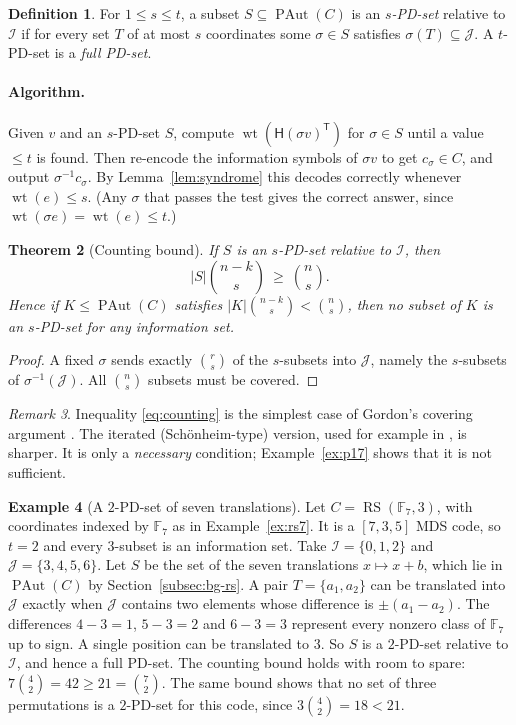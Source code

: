 \documentclass[12pt,letterpaper]{article}
\newtheorem{theorem}{Theorem}[section]
\theoremstyle{definition}
\newtheorem{definition}[theorem]{Definition}
\newtheorem{example}[theorem]{Example}
\theoremstyle{remark}
\newtheorem{remark}[theorem]{Remark}
\numberwithin{equation}{section}
\newcommand{\F}{\mathbb{F}}
\newcommand{\wt}{\operatorname{wt}}
\newcommand{\RS}{\operatorname{RS}}
\newcommand{\PAut}{\operatorname{PAut}}
\newcommand{\Hsys}{\mathsf{H}}
\newcommand{\cI}{\mathcal{I}}
\newcommand{\cJ}{\mathcal{J}}
\begin{document}
\begin{definition}\label{def:pd-set}
For $1\le s\le t$, a subset $S\subseteq\PAut(C)$ is an
\emph{$s$-PD-set} relative to $\cI$ if for every set $T$ of at most $s$
coordinates some $\sigma\in S$ satisfies $\sigma(T)\subseteq\cJ$.  A
$t$-PD-set is a \emph{full PD-set}.
\end{definition}

\paragraph{Algorithm.}
Given $v$ and an $s$-PD-set $S$, compute $\wt(\Hsys(\sigma v)^{\mathsf
T})$ for $\sigma\in S$ until a value $\le t$ is found.  Then re-encode the
information symbols of $\sigma v$ to get $c_\sigma\in C$, and output
$\sigma^{-1}c_\sigma$.  By Lemma~\ref{lem:syndrome} this decodes
correctly whenever $\wt(e)\le s$.  (Any $\sigma$ that passes the test
gives the correct answer, since $\wt(\sigma e)=\wt(e)\le t$.)

\begin{theorem}[Counting bound]\label{thm:counting}
If $S$ is an $s$-PD-set relative to $\cI$, then
\begin{equation}\label{eq:counting}
|S|\binom{n-k}{s}\ \ge\ \binom ns.
\end{equation}
Hence if $K\le\PAut(C)$ satisfies $|K|\binom{n-k}s<\binom ns$, then no
subset of $K$ is an $s$-PD-set for any information set.
\end{theorem}
\begin{proof}
A fixed $\sigma$ sends exactly $\binom rs$ of the $s$-subsets into $\cJ$,
namely the $s$-subsets of $\sigma^{-1}(\cJ)$.  All $\binom ns$ subsets
must be covered.
\end{proof}

\begin{remark}
Inequality \eqref{eq:counting} is the simplest case of Gordon's covering
argument \cite{Gor82}.  The iterated (Sch\"onheim-type) version, used for
example in \cite{KMM05}, is sharper.  It is only a \emph{necessary}
condition; Example~\ref{ex:p17} shows that it is not sufficient.
\end{remark}

\begin{example}[A $2$-PD-set of seven translations]\label{ex:pd-translations}
Let $C=\RS(\F_7,3)$, with coordinates indexed by $\F_7$ as in
Example~\ref{ex:rs7}. It is a $[7,3,5]$ MDS code, so $t=2$ and every
$3$-subset is an information set. Take $\cI=\{0,1,2\}$ and
$\cJ=\{3,4,5,6\}$. Let $S$ be the set of the seven translations
$x\mapsto x+b$, which lie in $\PAut(C)$ by
Section~\ref{subsec:bg-rs}. A pair $T=\{a_1,a_2\}$ can be translated
into $\cJ$ exactly when $\cJ$ contains two elements whose difference is
$\pm(a_1-a_2)$. The differences $4-3=1$, $5-3=2$ and $6-3=3$ represent
every nonzero class of $\F_7$ up to sign. A single position can be
translated to $3$. So $S$ is a $2$-PD-set relative to $\cI$, and hence a
full PD-set. The counting bound holds with room to spare:
$7\binom42=42\ge21=\binom72$. The same bound shows that no set of three
permutations is a $2$-PD-set for this code, since $3\binom42=18<21$.
\end{example}
\end{document}
